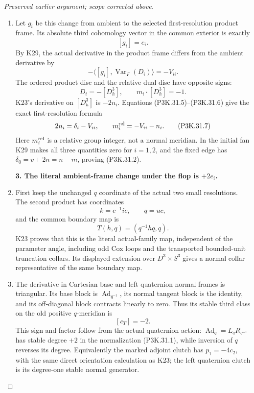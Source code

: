 \begin{proof}[Preserved earlier argument; scope corrected above]
\begin{enumerate}[label=\arabic*.]
\item Let \(g_i\) be this change from ambient to the selected
first-resolution product frame. Its absolute third
cohomology vector in the common exterior is exactly
\[
                              [g_i]=e_i.
                                                        \tag{P3K.31.5}
\]
By K29, the actual derivative in the product frame
differs from the ambient derivative by
\[
           -\langle[g_i],\operatorname{Var}_F(D_i)\rangle=-V_{ii}.
\]
The ordered product disc and the relative dual
disc have opposite signs:
\[
              D_i=-[D^3_h],\qquad
              m_i\cdot[D^3_h]=-1.
                                                        \tag{P3K.31.6}
\]
K23's derivative on \([D^3_h]\) is \(-2n_i\). Equations
(P3K.31.5)--(P3K.31.6) give the exact first-resolution formula
\[
                    2n_i=\delta_i-V_{ii},\qquad
                    m_i^{\rm rel}=-V_{ii}-n_i.
                                                        \tag{P3K.31.7}
\]
Here \(m_i^{\rm rel}\) is a relative group integer, not a
normal meridian. In the initial fan K29 makes all three
quantities zero for \(i=1,2\), and the fixed edge has
\(\delta_0=v+2n=n-m\), proving (P3K.31.2).

\par\medskip\noindent\textbf{3. The literal ambient-frame change under the flop is \(+2e_i\).}\enspace

\item First keep the unchanged \(q\) coordinate of the actual
two small resolutions. The second product has coordinates
\[
             k=c^{-1}ic,\qquad q=uc,
\]
and the common boundary map is
\[
                 T(h,q)=(q^{-1}h q,q).
                                                        \tag{P3K.31.8}
\]
K23 proves that this is the literal actual-family map,
independent of the parameter angle, including odd Cox
loops and the transported bounded-unit truncation collars.
Its displayed extension over \(D^3\times S^3\) gives a
normal collar representative of the same boundary map.

\item The derivative in Cartesian base and left quaternion
normal frames is triangular. Its base block is
\(\operatorname{Ad}_{q^{-1}}\), its normal tangent block
is the identity, and its off-diagonal block contracts
linearly to zero. Thus its stable third class on the
old positive \(q\)-meridian is
\[
                         [c_T]=-2.
                                                        \tag{P3K.31.9}
\]
This sign and factor follow from the actual quaternion
action: \(\operatorname{Ad}_q=L_qR_{q^{-1}}\) has stable
degree \(+2\) in the normalization (P3K.31.1), while inversion
of \(q\) reverses its degree. Equivalently the marked
adjoint clutch has \(p_1=-4c_2\), with the same direct
orientation calculation as K23; the left quaternion
clutch is its degree-one stable normal generator.


\end{enumerate}
\end{proof}

